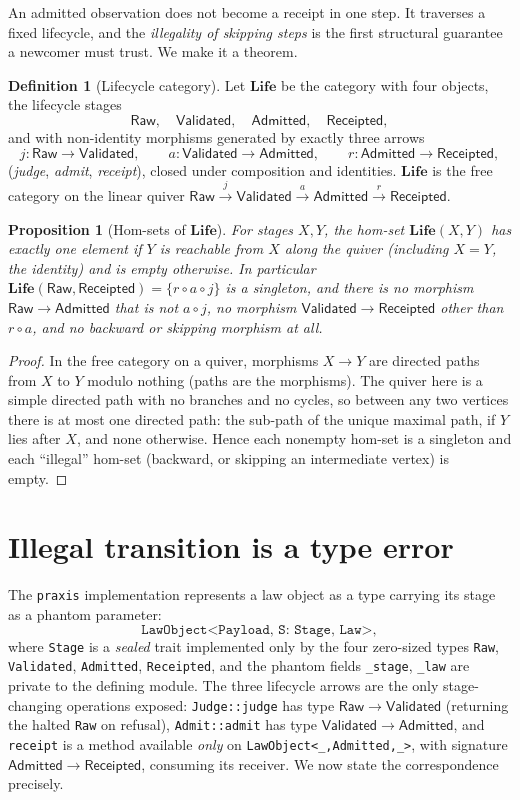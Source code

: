 \documentclass[11pt,oneside]{book}
\theoremstyle{definition}
\newtheorem{definition}{Definition}[chapter]
\theoremstyle{plain}
\newtheorem{proposition}[theorem]{Proposition}
\theoremstyle{remark}
\newcommand{\Raw}{\mathsf{Raw}}
\newcommand{\Val}{\mathsf{Validated}}
\newcommand{\Admd}{\mathsf{Admitted}}
\newcommand{\Rcpt}{\mathsf{Receipted}}
\newcommand{\Life}{\mathbf{Life}}
\newcommand{\code}[1]{\texttt{#1}}
\begin{document}
An admitted observation does not become a receipt in one step. It traverses a fixed
lifecycle, and the \emph{illegality of skipping steps} is the first structural guarantee a
newcomer must trust. We make it a theorem.

\begin{definition}[Lifecycle category]\label{def:lifecat}
Let $\Life$ be the category with four objects, the lifecycle stages
\[
\Raw,\quad \Val,\quad \Admd,\quad \Rcpt,
\]
and with non-identity morphisms generated by exactly three arrows
\[
j:\Raw\to\Val,\qquad a:\Val\to\Admd,\qquad r:\Admd\to\Rcpt,
\]
(\emph{judge}, \emph{admit}, \emph{receipt}), closed under composition and identities.
$\Life$ is the free category on the linear quiver
$\Raw\xrightarrow{j}\Val\xrightarrow{a}\Admd\xrightarrow{r}\Rcpt$.
\end{definition}

\begin{proposition}[Hom-sets of $\Life$]\label{prop:hom}
For stages $X,Y$, the hom-set $\Life(X,Y)$ has exactly one element if $Y$ is reachable from
$X$ along the quiver (including $X=Y$, the identity) and is empty otherwise. In particular
$\Life(\Raw,\Rcpt)=\{r\circ a\circ j\}$ is a singleton, and there is \emph{no} morphism
$\Raw\to\Admd$ that is not $a\circ j$, no morphism $\Val\to\Rcpt$ other than $r\circ a$, and
no backward or skipping morphism at all.
\end{proposition}

\begin{proof}
In the free category on a quiver, morphisms $X\to Y$ are directed paths from $X$ to $Y$ modulo
nothing (paths are the morphisms). The quiver here is a simple directed path with no branches
and no cycles, so between any two vertices there is at most one directed path: the sub-path
of the unique maximal path, if $Y$ lies after $X$, and none otherwise. Hence each nonempty
hom-set is a singleton and each ``illegal'' hom-set (backward, or skipping an intermediate
vertex) is empty. \end{proof}

\section{Illegal transition is a type error}

The \code{praxis} implementation represents a law object as a type carrying its stage as a
phantom parameter:
\[
\code{LawObject<Payload,\ S: Stage,\ Law>},
\]
where \code{Stage} is a \emph{sealed} trait implemented only by the four zero-sized types
\code{Raw}, \code{Validated}, \code{Admitted}, \code{Receipted}, and the phantom fields
\code{\_stage}, \code{\_law} are private to the defining module. The three lifecycle arrows
are the only stage-changing operations exposed:
\code{Judge::judge} has type $\Raw\to\Val$ (returning the halted \code{Raw} on refusal),
\code{Admit::admit} has type $\Val\to\Admd$, and \code{receipt} is a method available
\emph{only} on \code{LawObject<\_,Admitted,\_>}, with signature $\Admd\to\Rcpt$, consuming
its receiver. We now state the correspondence precisely.
\end{document}
